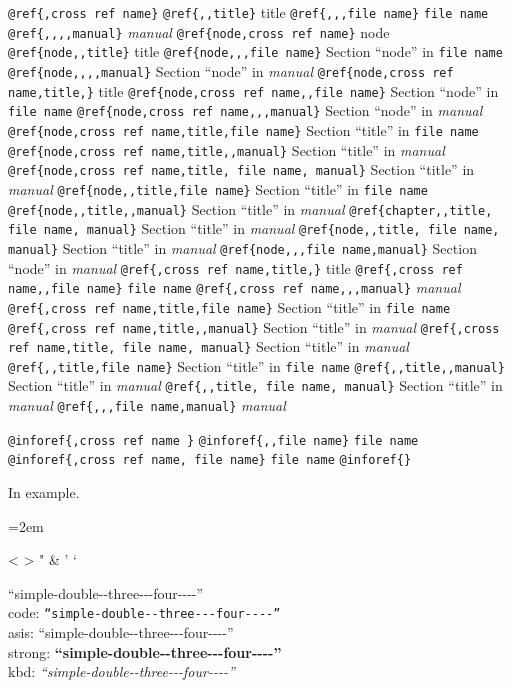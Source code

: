 \documentclass{book}
\begin{document}
\texttt{@ref\{,cross ref name\}} 
\texttt{@ref\{,,title\}} title
\texttt{@ref\{,,,file name\}} \texttt{file name}
\texttt{@ref\{,,,,manual\}} \textsl{manual}
\texttt{@ref\{node,cross ref name\}} node
\texttt{@ref\{node,,title\}} title
\texttt{@ref\{node,,,file name\}} Section ``node'' in \texttt{file name}
\texttt{@ref\{node,,,,manual\}} Section ``node'' in \textsl{manual}
\texttt{@ref\{node,cross ref name,title,\}} title
\texttt{@ref\{node,cross ref name,,file name\}} Section ``node'' in \texttt{file name}
\texttt{@ref\{node,cross ref name,,,manual\}} Section ``node'' in \textsl{manual}
\texttt{@ref\{node,cross ref name,title,file name\}} Section ``title'' in \texttt{file name}
\texttt{@ref\{node,cross ref name,title,,manual\}} Section ``title'' in \textsl{manual}
\texttt{@ref\{node,cross ref name,title, file name, manual\}} Section ``title'' in \textsl{manual}
\texttt{@ref\{node,,title,file name\}} Section ``title'' in \texttt{file name}
\texttt{@ref\{node,,title,,manual\}} Section ``title'' in \textsl{manual}
\texttt{@ref\{chapter,,title, file name, manual\}} Section ``title'' in \textsl{manual}
\texttt{@ref\{node,,title, file name, manual\}} Section ``title'' in \textsl{manual}
\texttt{@ref\{node,,,file name,manual\}} Section ``node'' in \textsl{manual}
\texttt{@ref\{,cross ref name,title,\}} title
\texttt{@ref\{,cross ref name,,file name\}} \texttt{file name}
\texttt{@ref\{,cross ref name,,,manual\}} \textsl{manual}
\texttt{@ref\{,cross ref name,title,file name\}} Section ``title'' in \texttt{file name}
\texttt{@ref\{,cross ref name,title,,manual\}} Section ``title'' in \textsl{manual}
\texttt{@ref\{,cross ref name,title, file name, manual\}} Section ``title'' in \textsl{manual}
\texttt{@ref\{,,title,file name\}} Section ``title'' in \texttt{file name}
\texttt{@ref\{,,title,,manual\}} Section ``title'' in \textsl{manual}
\texttt{@ref\{,,title, file name, manual\}} Section ``title'' in \textsl{manual}
\texttt{@ref\{,,,file name,manual\}} \textsl{manual}

\texttt{@inforef\{,cross ref name \}} 
\texttt{@inforef\{,,file name\}} \texttt{file name}
\texttt{@inforef\{,cross ref name, file name\}} \texttt{file name}
\texttt{@inforef\{\}} 



In example.
\par\begingroup\obeylines\obeyspaces\frenchspacing\leftskip=2em \parskip=0pt \parindent=0pt \ttfamily%

<
>
"
\&
'
`

``simple-double{-}{-}three{-}{-}{-}four{-}{-}{-}-''\leavevmode{}\\
code: \texttt{``simple-double{-}{-}three{-}{-}{-}four{-}{-}{-}-''} \leavevmode{}\\
asis: ``simple-double{-}{-}three{-}{-}{-}four{-}{-}{-}-'' \leavevmode{}\\
strong: \textbf{``simple-double{-}{-}three{-}{-}{-}four{-}{-}{-}-''} \leavevmode{}\\
kbd: {\ttfamily\textsl{``simple-double{-}{-}three{-}{-}{-}four{-}{-}{-}-''}} \leavevmode{}\\
\end{document}
